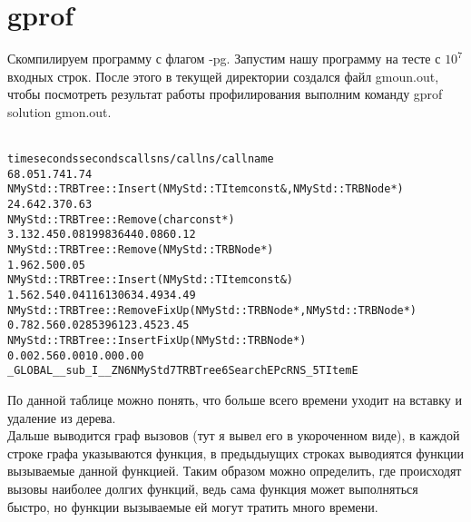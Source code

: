\section{gprof}
Скомпилируем программу с флагом -pg. Запустим нашу программу на тесте с $10^7$ входных строк. После этого в текущей директории создался файл gmoun.out,
чтобы посмотреть результат работы профилирования выполним команду gprof solution gmon.out.
\begin{alltt}{
%   cumulative   self              self     total           
time   seconds   seconds    calls  ns/call  ns/call  name    
68.05      1.74     1.74                             
NMyStd::TRBTree::Insert(NMyStd::TItem const&, NMyStd::TRBNode*)
24.64      2.37     0.63                             
NMyStd::TRBTree::Remove(char const*)
3.13      2.45     0.08  1998364    40.08    60.12  
NMyStd::TRBTree::Remove(NMyStd::TRBNode*)
1.96      2.50     0.05                             
NMyStd::TRBTree::Insert(NMyStd::TItem const&)
1.56      2.54     0.04  1161306    34.49    34.49  
NMyStd::TRBTree::RemoveFixUp(NMyStd::TRBNode*, NMyStd::TRBNode*)
0.78      2.56     0.02   853961    23.45    23.45  
NMyStd::TRBTree::InsertFixUp(NMyStd::TRBNode*)
0.00      2.56     0.00        1     0.00     0.00  
_GLOBAL__sub_I__ZN6NMyStd7TRBTree6SearchEPcRNS_5TItemE   
}    
\end{alltt}
По данной таблице можно понять, что больше всего времени уходит на вставку и удаление из дерева.
\\Дальше выводится граф вызовов (тут я вывел его в укороченном виде), в каждой строке графа указываются
функция, в предыдыущих строках выводиятся функции вызываемые данной функцией. Таким образом можно определить,
где происходят вызовы наиболее долгих функций, ведь сама функция может выполняться быстро, но функции вызываемые ей
могут тратить много времени.
